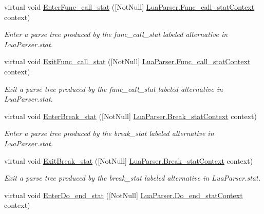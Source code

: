 \begin{DoxyCompactItemize}
virtual void \mbox{\hyperlink{classzlua_1_1_lua_base_listener_aeae8e0a0ca7fe9c5a24cb372585b81b7}{Enter\+Func\+\_\+call\+\_\+stat}} (\mbox{[}Not\+Null\mbox{]} \mbox{\hyperlink{classzlua_1_1_lua_parser_1_1_func__call__stat_context}{Lua\+Parser.\+Func\+\_\+call\+\_\+stat\+Context}} context)
\begin{DoxyCompactList}\small\item\em Enter a parse tree produced by the {\ttfamily func\+\_\+call\+\_\+stat} labeled alternative in Lua\+Parser.\+stat. \end{DoxyCompactList}\item 
virtual void \mbox{\hyperlink{classzlua_1_1_lua_base_listener_a89ec0f76f1e78b15a72de26783bc6694}{Exit\+Func\+\_\+call\+\_\+stat}} (\mbox{[}Not\+Null\mbox{]} \mbox{\hyperlink{classzlua_1_1_lua_parser_1_1_func__call__stat_context}{Lua\+Parser.\+Func\+\_\+call\+\_\+stat\+Context}} context)
\begin{DoxyCompactList}\small\item\em Exit a parse tree produced by the {\ttfamily func\+\_\+call\+\_\+stat} labeled alternative in Lua\+Parser.\+stat. \end{DoxyCompactList}\item 
virtual void \mbox{\hyperlink{classzlua_1_1_lua_base_listener_a6adb675854ff8e7a3a92ca58e5f198b2}{Enter\+Break\+\_\+stat}} (\mbox{[}Not\+Null\mbox{]} \mbox{\hyperlink{classzlua_1_1_lua_parser_1_1_break__stat_context}{Lua\+Parser.\+Break\+\_\+stat\+Context}} context)
\begin{DoxyCompactList}\small\item\em Enter a parse tree produced by the {\ttfamily break\+\_\+stat} labeled alternative in Lua\+Parser.\+stat. \end{DoxyCompactList}\item 
virtual void \mbox{\hyperlink{classzlua_1_1_lua_base_listener_ac0f699c3a181d8236218792a69955d0d}{Exit\+Break\+\_\+stat}} (\mbox{[}Not\+Null\mbox{]} \mbox{\hyperlink{classzlua_1_1_lua_parser_1_1_break__stat_context}{Lua\+Parser.\+Break\+\_\+stat\+Context}} context)
\begin{DoxyCompactList}\small\item\em Exit a parse tree produced by the {\ttfamily break\+\_\+stat} labeled alternative in Lua\+Parser.\+stat. \end{DoxyCompactList}\item 
virtual void \mbox{\hyperlink{classzlua_1_1_lua_base_listener_aea9c92211c8619f5d2cf426ee5380be4}{Enter\+Do\+\_\+end\+\_\+stat}} (\mbox{[}Not\+Null\mbox{]} \mbox{\hyperlink{classzlua_1_1_lua_parser_1_1_do__end__stat_context}{Lua\+Parser.\+Do\+\_\+end\+\_\+stat\+Context}} context)

\end{DoxyCompactItemize}
